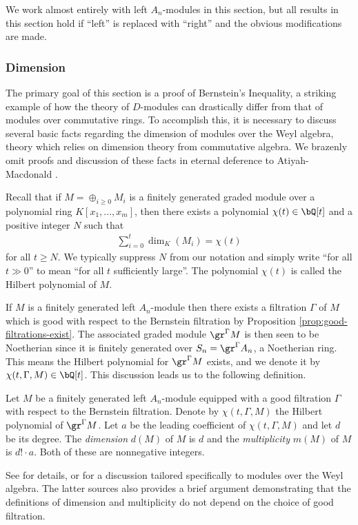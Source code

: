 We work almost entirely with left $A_n$-modules in this section, but all results in this section hold if ``left'' is replaced with ``right'' and the obvious modifications are made.

\subsubsection{Dimension}
The primary goal of this section is a proof of Bernstein's Inequality, a striking example of how the theory of $D$-modules can drastically differ from that of modules over commutative rings. To accomplish this, it is necessary to discuss several basic facts regarding the dimension of modules over the Weyl algebra, theory which relies on dimension theory from commutative algebra. We brazenly omit proofs and discussion of these facts in eternal deference to Atiyah-Macdonald \cite{am}.

Recall that if $M = \oplus_{i \geq 0} M_i$ is a finitely generated graded module over a polynomial ring $K[x_1,...,x_m]$, then there exists a polynomial $\chi(t) \in \bQ[t]$ and a positive integer $N$ such that 
\begin{align*}
	\sum_{i = 0}^t \dim_K(M_i) = \chi(t)
\end{align*}
for all $t \geq N$. We typically suppress $N$ from our notation and simply write ``for all $t \gg 0$'' to mean ``for all $t$ sufficiently large''. The polynomial $\chi(t)$ is called the Hilbert polynomial of $M$.

If $M$ is a finitely generated left $A_n$-module then there exists a filtration $\Gamma$ of $M$ which is good with respect to the Bernstein filtration by Proposition \ref{prop:good-filtrations-exist}. The associated graded module $\gr^\Gamma M$ is then seen to be Noetherian since it is finitely generated over $S_n = \gr^\Gamma A_n$, a Noetherian ring. This means the Hilbert polynomial for $\gr^\Gamma M$ exists, and we denote it by $\chi(t,\Gamma,M) \in \bQ[t]$. This discussion leads us to the following definition.
\begin{defn}\label{defn:dimension-multiplicity}
	Let $M$ be a finitely generated left $A_n$-module equipped with a good filtration $\Gamma$ with respect to the Bernstein filtration. Denote by $\chi(t,\Gamma,M)$ the Hilbert polynomial of $\gr^\Gamma M$. Let $a$ be the leading coefficient of $\chi(t,\Gamma,M)$ and let $d$ be its degree. The \emph{dimension} $d(M)$ of $M$ is $d$ and the \emph{multiplicity} $m(M)$ of $M$ is $d!\cdot a$. Both of these are nonnegative integers.
\end{defn}
See \cite{am} for details, or \cite[Chapter 9]{d-mod-primer} for a discussion tailored specifically to modules over the Weyl algebra. The latter sources also provides a brief argument demonstrating that the definitions of dimension and multiplicity do not depend on the choice of good filtration.

